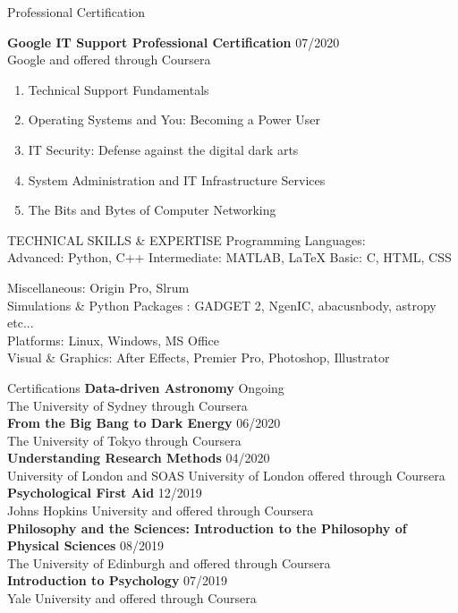 \documentclass{resume} %
\begin{document}
\begin{rSection}{Professional Certification}

\textbf{Google IT Support Professional Certification} \hfill 07/2020\\
Google and offered through Coursera 
\begin{enumerate}
	\itemsep-0.25cm
	\item Technical Support Fundamentals
	\item Operating Systems and You: Becoming a Power User
	\item IT Security: Defense against the digital dark arts
	\item System Administration and IT Infrastructure Services
	\item The Bits and Bytes of Computer Networking
\end{enumerate}

\end{rSection}

\begin{rSection}{TECHNICAL SKILLS \& EXPERTISE}{}
	Programming Languages:\\ 
	Advanced: Python, C++  \textbar{}  Intermediate: MATLAB, LaTeX \textbar{} Basic: C, HTML, CSS  
	
	\item Miscellaneous: Origin Pro, Slrum \\
	Simulations \& Python Packages : GADGET 2, NgenIC, abacusnbody, astropy etc... \\
	Platforms: Linux, Windows, MS Office \\ 
	Visual \& Graphics: After Effects, Premier Pro, Photoshop, Illustrator 
\end{rSection}

\begin{rSection}{Certifications}
\textbf{Data-driven Astronomy }\hfill Ongoing\\
The University of Sydney through Coursera \\
\textbf{From the Big Bang to Dark Energy }\hfill 06/2020\\
The University of Tokyo through Coursera \\
\textbf{Understanding Research Methods }\hfill 04/2020\\
University of London and SOAS University of London offered through Coursera  \\
\textbf{Psychological First Aid} \hfill 12/2019\\
Johns Hopkins University and offered through Coursera \\
\textbf{Philosophy and the Sciences: Introduction to the Philosophy of Physical Sciences } \hfill 08/2019\\
The University of Edinburgh and offered through Coursera  \\
\textbf{Introduction to Psychology }\hfill 07/2019\\
Yale University and offered through Coursera 
\end{rSection}
\end{document}
